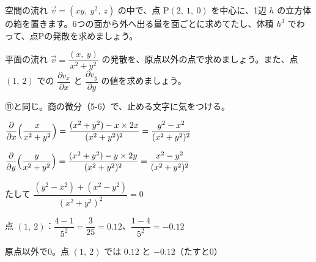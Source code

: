 \begin{jibun}
空間の流れ $\vec v=(xy,\ y^2,\ z)$ の中で、点 $\mathrm P(2,\ 1,\ 0)$ を中心に、1辺 $h$ の立方体の箱を置きます。6つの面から外へ出る量を面ごとに求めてたし、体積 $h^3$ でわって、点Pの発散を求めましょう。
\end{jibun}
\begin{reidai}[点のわき出しの場の発散]
平面の流れ $\vec v=\dfrac{(x,\ y)}{x^2+y^2}$ の発散を、原点以外の点で求めましょう。また、点 $(1,\ 2)$ での $\dfrac{\partial v_x}{\partial x}$ と $\dfrac{\partial v_y}{\partial y}$ の値を求めましょう。\par
\kangaekata ⑪と同じ。商の微分（5-6）で、止める文字に気をつける。\par
\shiki\kviiijs{}\zw{} $\dfrac{\partial}{\partial x}\Bigl(\dfrac{x}{x^2+y^2}\Bigr)=\dfrac{(x^2+y^2)-x\times2x}{(x^2+y^2)^2}=\dfrac{y^2-x^2}{(x^2+y^2)^2}$\par
\kviiija $\dfrac{\partial}{\partial y}\Bigl(\dfrac{y}{x^2+y^2}\Bigr)=\dfrac{(x^2+y^2)-y\times2y}{(x^2+y^2)^2}=\dfrac{x^2-y^2}{(x^2+y^2)^2}$\par
\kviiija たして $\dfrac{(y^2-x^2)+(x^2-y^2)}{(x^2+y^2)^2}=0$\par
\kviiija 点 $(1,\ 2)$：$\dfrac{4-1}{5^2}=\dfrac{3}{25}=0.12$、$\dfrac{1-4}{5^2}=-0.12$\par
\kotae\kviiijs{}\zw{} 原点以外で0。点 $(1,\ 2)$ では $0.12$ と $-0.12$（たすと0）
\end{reidai}

